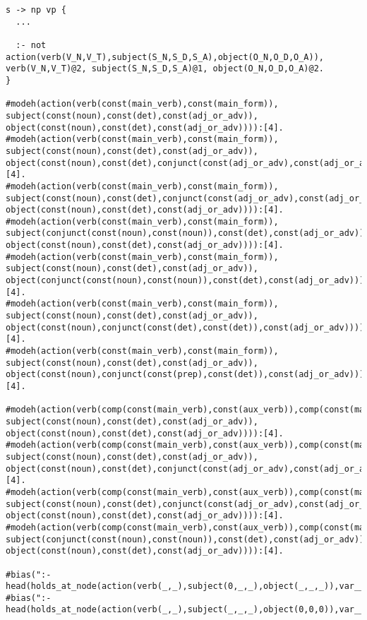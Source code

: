 \begin{lstlisting}
s -> np vp {
  ...
  
  :- not action(verb(V_N,V_T),subject(S_N,S_D,S_A),object(O_N,O_D,O_A)), verb(V_N,V_T)@2, subject(S_N,S_D,S_A)@1, object(O_N,O_D,O_A)@2.
}

#modeh(action(verb(const(main_verb),const(main_form)), subject(const(noun),const(det),const(adj_or_adv)), object(const(noun),const(det),const(adj_or_adv)))):[4].
#modeh(action(verb(const(main_verb),const(main_form)), subject(const(noun),const(det),const(adj_or_adv)), object(const(noun),const(det),conjunct(const(adj_or_adv),const(adj_or_adv))))):[4].
#modeh(action(verb(const(main_verb),const(main_form)), subject(const(noun),const(det),conjunct(const(adj_or_adv),const(adj_or_adv))), object(const(noun),const(det),const(adj_or_adv)))):[4].
#modeh(action(verb(const(main_verb),const(main_form)), subject(conjunct(const(noun),const(noun)),const(det),const(adj_or_adv)), object(const(noun),const(det),const(adj_or_adv)))):[4].
#modeh(action(verb(const(main_verb),const(main_form)), subject(const(noun),const(det),const(adj_or_adv)), object(conjunct(const(noun),const(noun)),const(det),const(adj_or_adv)))):[4].
#modeh(action(verb(const(main_verb),const(main_form)), subject(const(noun),const(det),const(adj_or_adv)), object(const(noun),conjunct(const(det),const(det)),const(adj_or_adv)))):[4].
#modeh(action(verb(const(main_verb),const(main_form)), subject(const(noun),const(det),const(adj_or_adv)), object(const(noun),conjunct(const(prep),const(det)),const(adj_or_adv)))):[4].

#modeh(action(verb(comp(const(main_verb),const(aux_verb)),comp(const(main_form),const(aux_form))), subject(const(noun),const(det),const(adj_or_adv)), object(const(noun),const(det),const(adj_or_adv)))):[4].
#modeh(action(verb(comp(const(main_verb),const(aux_verb)),comp(const(main_form),const(aux_form))), subject(const(noun),const(det),const(adj_or_adv)), object(const(noun),const(det),conjunct(const(adj_or_adv),const(adj_or_adv))))):[4].
#modeh(action(verb(comp(const(main_verb),const(aux_verb)),comp(const(main_form),const(aux_form))), subject(const(noun),const(det),conjunct(const(adj_or_adv),const(adj_or_adv))), object(const(noun),const(det),const(adj_or_adv)))):[4].
#modeh(action(verb(comp(const(main_verb),const(aux_verb)),comp(const(main_form),const(aux_form))), subject(conjunct(const(noun),const(noun)),const(det),const(adj_or_adv)), object(const(noun),const(det),const(adj_or_adv)))):[4].

#bias(":- head(holds_at_node(action(verb(_,_),subject(0,_,_),object(_,_,_)),var__(1))).").
#bias(":- head(holds_at_node(action(verb(_,_),subject(_,_,_),object(0,0,0)),var__(1))).").


\end{lstlisting}
